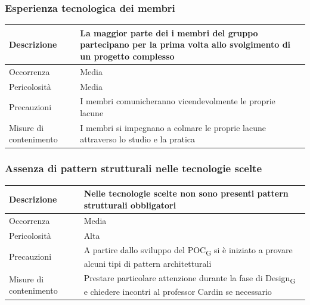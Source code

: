 \documentclass{article}
\begin{document}
\subsubsection{Esperienza tecnologica dei membri}
\begin{center}
\begin{tabular}{|P{10em}| P{20em}|} 
\hline
     Descrizione & La maggior parte dei i membri del gruppo partecipano per la prima volta allo svolgimento di un progetto complesso \\ 
     \hline
    Occorrenza & Media\\
    \hline
    Pericolosità & Media \\
    \hline
    Precauzioni & I membri comunicheranno vicendevolmente le proprie lacune\\
    \hline
    Misure di contenimento & I membri si impegnano a colmare le proprie lacune attraverso lo studio e la pratica \\
    \hline
\end{tabular}
\label{tab:esptec}
\end{center}

\subsubsection{Assenza di pattern strutturali nelle tecnologie scelte}
\begin{center}
\begin{tabular}{|P{10em} |P{20em}|} 
\hline
     Descrizione & Nelle tecnologie scelte non sono presenti pattern strutturali obbligatori \\ 
     \hline
    Occorrenza & Media\\
    \hline
    Pericolosità & Alta \\
    \hline
    Precauzioni & A partire dallo sviluppo del POC\textsubscript{G} si è iniziato a provare alcuni tipi di pattern architetturali\\
    \hline
    Misure di contenimento & Prestare particolare attenzione durante la fase di Design\textsubscript{G} e chiedere incontri al professor Cardin se necessario \\
    \hline
\end{tabular}
\label{tab:esptec}
\end{center}
\end{document}
